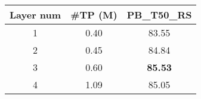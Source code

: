 \begin{table*}
{\begin{subtable}[t]{0.24\linewidth}
        \begin{tabularx}{\textwidth}{ccc}
            \toprule
            Layer num & \#TP (M) & PB\_T50\_RS \\
            \midrule
            1 & 0.40 & 83.55 \\
            2 & 0.45 & 84.84 \\
            \rowcolor{linecolor!40}3 & 0.60 & \textbf{85.53} \\
            4 & 1.09 & 85.05 \\
            \bottomrule
        \end{tabularx}
    \end{subtable}
}
\end{table*}